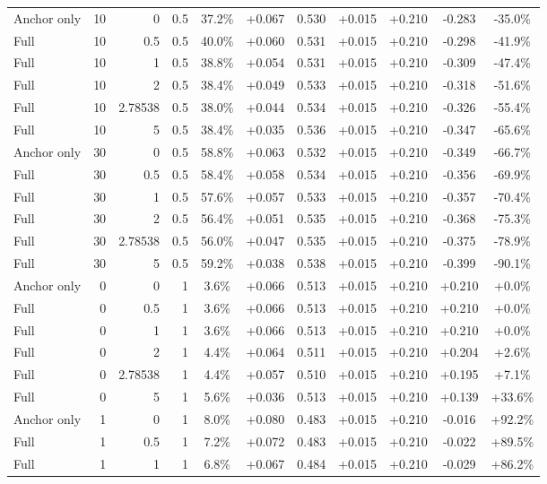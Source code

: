 \begin{table}[htbp]
\begin{tabular}{lrrrccccccc}
Anchor only & 10 & 0 & 0.5 & 37.2\% & +0.067 & 0.530 & +0.015 & +0.210 & -0.283 & -35.0\% \\
Full & 10 & 0.5 & 0.5 & 40.0\% & +0.060 & 0.531 & +0.015 & +0.210 & -0.298 & -41.9\% \\
Full & 10 & 1 & 0.5 & 38.8\% & +0.054 & 0.531 & +0.015 & +0.210 & -0.309 & -47.4\% \\
Full & 10 & 2 & 0.5 & 38.4\% & +0.049 & 0.533 & +0.015 & +0.210 & -0.318 & -51.6\% \\
Full & 10 & 2.78538 & 0.5 & 38.0\% & +0.044 & 0.534 & +0.015 & +0.210 & -0.326 & -55.4\% \\
Full & 10 & 5 & 0.5 & 38.4\% & +0.035 & 0.536 & +0.015 & +0.210 & -0.347 & -65.6\% \\
Anchor only & 30 & 0 & 0.5 & 58.8\% & +0.063 & 0.532 & +0.015 & +0.210 & -0.349 & -66.7\% \\
Full & 30 & 0.5 & 0.5 & 58.4\% & +0.058 & 0.534 & +0.015 & +0.210 & -0.356 & -69.9\% \\
Full & 30 & 1 & 0.5 & 57.6\% & +0.057 & 0.533 & +0.015 & +0.210 & -0.357 & -70.4\% \\
Full & 30 & 2 & 0.5 & 56.4\% & +0.051 & 0.535 & +0.015 & +0.210 & -0.368 & -75.3\% \\
Full & 30 & 2.78538 & 0.5 & 56.0\% & +0.047 & 0.535 & +0.015 & +0.210 & -0.375 & -78.9\% \\
Full & 30 & 5 & 0.5 & 59.2\% & +0.038 & 0.538 & +0.015 & +0.210 & -0.399 & -90.1\% \\
Anchor only & 0 & 0 & 1 & 3.6\% & +0.066 & 0.513 & +0.015 & +0.210 & +0.210 & +0.0\% \\
Full & 0 & 0.5 & 1 & 3.6\% & +0.066 & 0.513 & +0.015 & +0.210 & +0.210 & +0.0\% \\
Full & 0 & 1 & 1 & 3.6\% & +0.066 & 0.513 & +0.015 & +0.210 & +0.210 & +0.0\% \\
Full & 0 & 2 & 1 & 4.4\% & +0.064 & 0.511 & +0.015 & +0.210 & +0.204 & +2.6\% \\
Full & 0 & 2.78538 & 1 & 4.4\% & +0.057 & 0.510 & +0.015 & +0.210 & +0.195 & +7.1\% \\
Full & 0 & 5 & 1 & 5.6\% & +0.036 & 0.513 & +0.015 & +0.210 & +0.139 & +33.6\% \\
Anchor only & 1 & 0 & 1 & 8.0\% & +0.080 & 0.483 & +0.015 & +0.210 & -0.016 & +92.2\% \\
Full & 1 & 0.5 & 1 & 7.2\% & +0.072 & 0.483 & +0.015 & +0.210 & -0.022 & +89.5\% \\
Full & 1 & 1 & 1 & 6.8\% & +0.067 & 0.484 & +0.015 & +0.210 & -0.029 & +86.2\% \\

\end{tabular}
\end{table}
